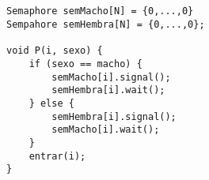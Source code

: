 \subsection{}

\begin{codesnippet}
\begin{verbatim}
Semaphore semMacho[N] = {0,...,0}
Sempahore semHembra[N] = {0,...,0};

void P(i, sexo) {
    if (sexo == macho) {
        semMacho[i].signal();
        semHembra[i].wait();
    } else {
        semHembra[i].signal();
        semMacho[i].wait();
    }
    entrar(i);
}
\end{verbatim}
\end{codesnippet}